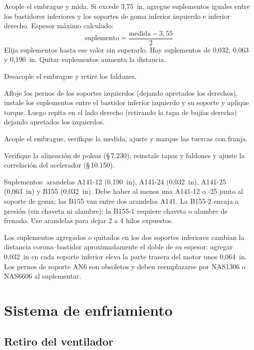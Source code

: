 \begin{pasos}
\item Acople el embrague y mida. Si excede 3,75~in, agregue suplementos iguales entre los bastidores inferiores y los soportes de goma inferior izquierdo e inferior derecho. Espesor máximo calculado:
\[
\text{suplemento} = \frac{\text{medida} - 3{,}55}{2}
\]
Elija suplementos hasta ese valor sin superarlo. Hay suplementos de 0,032, 0,063 y 0,190~in. Quitar suplementos aumenta la distancia.
\item Desacople el embrague y retire los faldones.
\item Afloje los pernos de los soportes izquierdos (dejando apretados los derechos), instale los suplementos entre el bastidor inferior izquierdo y su soporte y aplique torque. Luego repita en el lado derecho (retirando la tapa de bujías derecha) dejando apretados los izquierdos.
\item Acople el embrague, verifique la medida, ajuste y marque las tuercas con franja.
\item Verifique la alineación de poleas (\S\,7.230), reinstale tapas y faldones y ajuste la correlación del acelerador (\S\,10.150).
\end{pasos}

Suplementos: arandelas A141-12 (0,190~in), A141-24 (0,032~in), A141-25 (0,063~in) y B155 (0,032~in). Debe haber al menos una A141-12 o -25 junto al soporte de goma; las B155 van entre dos arandelas A141. La B155-2 encaja a presión (sin chaveta ni alambre); la B155-1 requiere chaveta o alambre de frenado. Use arandelas para dejar 2 a 4 hilos expuestos.

\begin{nota}
Los suplementos agregados o quitados en los dos soportes inferiores cambian la distancia corona--bastidor aproximadamente el doble de su espesor: agregar 0,032~in en cada soporte inferior eleva la parte trasera del motor unos 0,064~in. Los pernos de soporte AN6 son obsoletos y deben reemplazarse por NAS1306 o NAS6606 al suplementar.
\end{nota}

\section{Sistema de enfriamiento}

\subsection{Retiro del ventilador}

